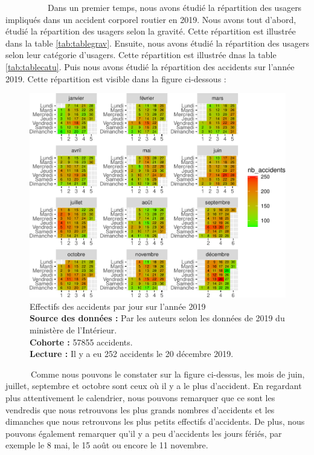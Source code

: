 \documentclass[french,]{tp}
\begin{document}
~~~~~~~~~~Dans un premier temps, nous avons étudié la répartition des usagers impliqués dans un accident corporel routier en 2019. Nous avons tout d'abord, étudié la répartition des usagers selon la gravité. Cette répartition est illustrée dans la table \ref{tab:tablegrav}. Ensuite, nous avons étudié la répartition des usagers selon leur catégorie d'usagers. Cette répartition est illustrée dnas la table \ref{tab:tablecatu}. Puis nous avons étudié la répartition des accidents sur l'année 2019. Cette répartition est visible dans la figure ci-dessous :






\begin{figure}[ht!]

{\centering \includegraphics{Prediction_Gravite_files/figure-latex/calendrier-1} 

}

\caption{Effectifs des accidents par jour sur l'année 2019\\
\textbf{Source des données :} Par les auteurs selon les données de 2019 du ministère de l'Intérieur.\\
\textbf{Cohorte :} 57855 accidents.\\
\textbf{Lecture :} Il y a eu 252 accidents le 20 décembre 2019.}\label{fig:calendrier}
\end{figure}

~~~~~~Comme nous pouvons le constater sur la figure ci-dessus, les mois de juin, juillet, septembre et octobre sont ceux où il y a le plus d'accident. En regardant plus attentivement le calendrier, nous pouvons remarquer que ce sont les vendredis que nous retrouvons les plus grands nombres d'accidents et les dimanches que nous retrouvons les plus petits effectifs d'accidents. De plus, nous pouvons également remarquer qu'il y a peu d'accidents les jours fériés, par exemple le 8 mai, le 15 août ou encore le 11 novembre.
\end{document}
